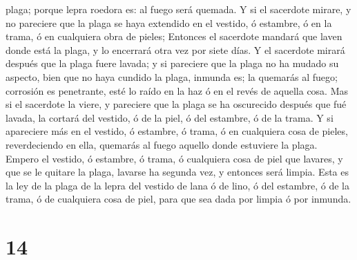 plaga; porque lepra roedora es: al fuego será quemada.  Y
si el sacerdote mirare, y no pareciere que la plaga se haya extendido en
el vestido, ó estambre, ó en la trama, ó en cualquiera obra de pieles;
 Entonces el sacerdote mandará que laven donde está la
plaga, y lo encerrará otra vez por siete días.  Y el
sacerdote mirará después que la plaga fuere lavada; y si pareciere que
la plaga no ha mudado su aspecto, bien que no haya cundido la plaga,
inmunda es; la quemarás al fuego; corrosión es penetrante, esté lo raído
en la haz ó en el revés de aquella cosa.  Mas si el
sacerdote la viere, y pareciere que la plaga se ha oscurecido después
que fué lavada, la cortará del vestido, ó de la piel, ó del estambre, ó
de la trama.  Y si apareciere más en el vestido, ó
estambre, ó trama, ó en cualquiera cosa de pieles, reverdeciendo en
ella, quemarás al fuego aquello donde estuviere la plaga.
 Empero el vestido, ó estambre, ó trama, ó cualquiera
cosa de piel que lavares, y que se le quitare la plaga, lavarse ha
segunda vez, y entonces será limpia.  Esta es la ley de
la plaga de la lepra del vestido de lana ó de lino, ó del estambre, ó de
la trama, ó de cualquiera cosa de piel, para que sea dada por limpia ó
por inmunda.

\hypertarget{section-13}{%
\section{14}\label{section-13}}


